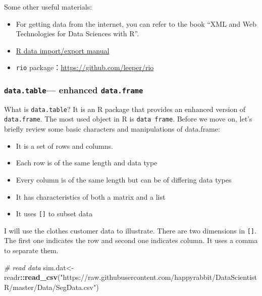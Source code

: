 \documentclass[
]{article}
\newenvironment{Shaded}{\begin{snugshade}}{\end{snugshade}}
\newcommand{\CommentTok}[1]{\textcolor[rgb]{0.56,0.35,0.01}{\textit{#1}}}
\newcommand{\KeywordTok}[1]{\textcolor[rgb]{0.13,0.29,0.53}{\textbf{#1}}}
\newcommand{\NormalTok}[1]{#1}
\newcommand{\OperatorTok}[1]{\textcolor[rgb]{0.81,0.36,0.00}{\textbf{#1}}}
\newcommand{\StringTok}[1]{\textcolor[rgb]{0.31,0.60,0.02}{#1}}
\providecommand{\tightlist}{%
  \setlength{\itemsep}{0pt}\setlength{\parskip}{0pt}}
\begin{document}
Some other useful materials:

\begin{itemize}
\tightlist
\item
  For getting data from the internet, you can refer to the book ``XML
  and Web Technologies for Data Sciences with R''.\\
\item
  \href{https://cran.r-project.org/doc/manuals/r-release/R-data.html\#Acknowledgements}{R
  data import/export manual}
\item
  \texttt{rio} package：\url{https://github.com/leeper/rio}
\end{itemize}

\hypertarget{data.table-enhanced-data.frame}{%
\subsubsection{\texorpdfstring{\texttt{data.table}--- enhanced
\texttt{data.frame}}{data.table--- enhanced data.frame}}\label{data.table-enhanced-data.frame}}

What is \texttt{data.table}? It is an R package that provides an
enhanced version of \texttt{data.frame}. The most used object in R is
\texttt{data\ frame}. Before we move on, let's briefly review some basic
characters and manipulations of data.frame:

\begin{itemize}
\tightlist
\item
  It is a set of rows and columns.
\item
  Each row is of the same length and data type
\item
  Every column is of the same length but can be of differing data types
\item
  It has characteristics of both a matrix and a list
\item
  It uses \texttt{{[}{]}} to subset data
\end{itemize}

I will use the clothes customer data to illustrate. There are two
dimensions in \texttt{{[}{]}}. The first one indicates the row and
second one indicates column. It uses a comma to separate them.

\begin{Shaded}
\begin{Highlighting}[]
\CommentTok{# read data}
\NormalTok{sim.dat<-readr}\OperatorTok{::}\KeywordTok{read_csv}\NormalTok{(}\StringTok{"https://raw.githubusercontent.com/happyrabbit/DataScientistR/master/Data/SegData.csv"}\NormalTok{)}
\end{Highlighting}
\end{Shaded}
\end{document}
